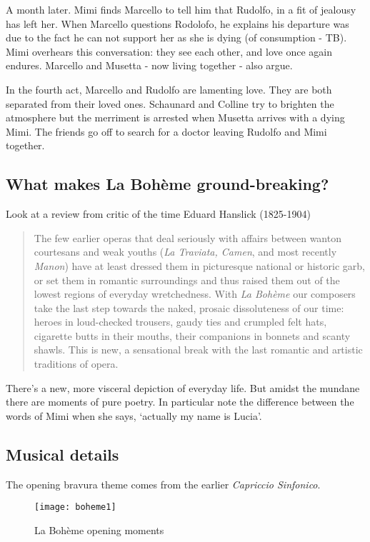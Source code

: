 A month later. Mimi finds Marcello to tell him that Rudolfo, in a fit of jealousy has left her. When Marcello questions Rodolofo, he explains his departure was due to the fact he can not support her as she is dying (of consumption - TB). Mimi overhears this conversation: they see each other, and love once again endures. Marcello and Musetta - now living together - also argue. 

In the fourth act, Marcello and Rudolfo are lamenting love. They are both separated from their loved ones. Schaunard and Colline try to brighten the atmosphere but the merriment is arrested when Musetta arrives with a dying Mimi. The friends go off to search for a doctor leaving Rudolfo and Mimi together. 

\subsection{What makes La Boh\`eme ground-breaking?}
Look at a review from critic of the time Eduard Hanslick (1825-1904)
\begin{quotation}
The few earlier operas that deal seriously with affairs between wanton courtesans and weak youths (\textit{La Traviata, Camen}, and most recently \textit{Manon}) have at least dressed them in picturesque national or historic garb, or set them in romantic surroundings and thus raised them out of the lowest regions of everyday wretchedness. With \textit{La Boh\`eme} our composers take the last step towards the naked, prosaic dissoluteness of our time: heroes in loud-checked trousers, gaudy ties and crumpled felt hats, cigarette butts in their mouths, their companions in bonnets and scanty shawls. This is new, a sensational break with the last romantic and artistic traditions of opera.
\end{quotation}

There's a new, more visceral depiction of everyday life. But amidst the mundane there are moments of pure poetry. In particular note the difference between the words of Mimi when she says, `actually my name is Lucia'. 

\subsection{Musical details}

The opening bravura theme comes from the earlier \textit{Capriccio Sinfonico}. 

\begin{figure}[H]
\centering
\texttt{[image: boheme1]}\caption{La Boh\`eme opening moments}
\label{fig:boheme1}
\end{figure}

